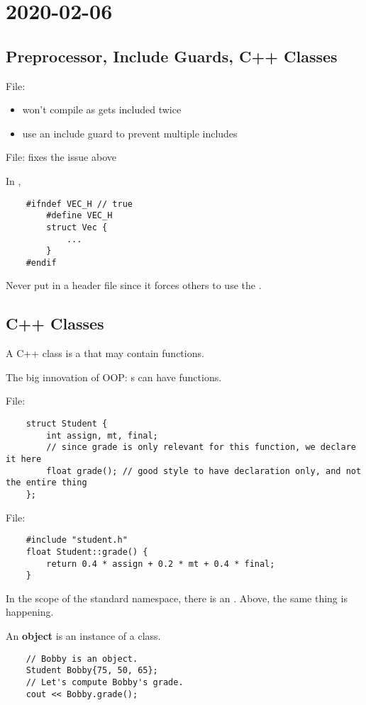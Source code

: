 \section{2020-02-06}
\subsection{Preprocessor, Include Guards, C++ Classes}
File: 
\begin{itemize}
    \item won't compile as  gets included twice
    \item use an include guard to prevent multiple includes
\end{itemize}
File:  \textrightarrow{} fixes the issue above

In ,
\begin{lstlisting}
    #ifndef VEC_H // true
        #define VEC_H
        struct Vec {
            ...
        }
    #endif
\end{lstlisting}
Never put  in a header file since it forces
others to use the .

\subsection{C++ Classes}
A C++ class is a  that may contain functions.

The big innovation of OOP\@: s can have functions.

File: 
\begin{lstlisting}
    struct Student {
        int assign, mt, final;
        // since grade is only relevant for this function, we declare it here
        float grade(); // good style to have declaration only, and not the entire thing
    };
\end{lstlisting}

File: 
\begin{lstlisting}
    #include "student.h"
    float Student::grade() {
        return 0.4 * assign + 0.2 * mt + 0.4 * final;
    }
\end{lstlisting}
 \textrightarrow{}
In the scope of the standard namespace, there is an .
Above, the same thing is happening.

An \textbf{object} is an instance of a class.
\begin{lstlisting}
    // Bobby is an object.
    Student Bobby{75, 50, 65};
    // Let's compute Bobby's grade.
    cout << Bobby.grade();
\end{lstlisting}

